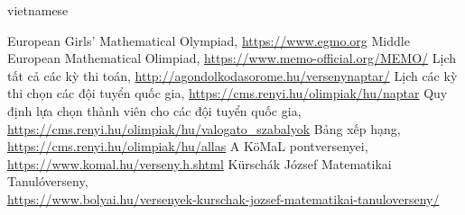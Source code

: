 \documentclass{article}
\begin{document}
\begin{otherlanguage*}{vietnamese}
\begin{thebibliography}{99}
     European Girls' Mathematical Olympiad, \url{https://www.egmo.org}
     Middle European Mathematical Olimpiad, \url{https://www.memo-official.org/MEMO/}
     Lịch tất cả các kỳ thi toán, \url{http://agondolkodasorome.hu/versenynaptar/}
     Lịch các kỳ thi chọn các đội tuyển quốc gia, \url{https://cms.renyi.hu/olimpiak/hu/naptar}
     Quy định lựa chọn thành viên cho các đội tuyển quốc gia,\\ \url{https://cms.renyi.hu/olimpiak/hu/valogato_szabalyok}
     Bảng xếp hạng,\\ \url{https://cms.renyi.hu/olimpiak/hu/allas}
     A KöMaL pontversenyei, \url{https://www.komal.hu/verseny.h.shtml}
     Kürschák József Matematikai Tanulóverseny,\\ \url{https://www.bolyai.hu/versenyek-kurschak-jozsef-matematikai-tanuloverseny/}
\end{thebibliography}

\end{otherlanguage*}
\end{document}
